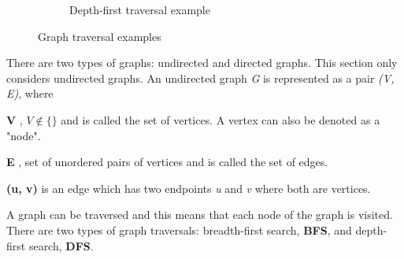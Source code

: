 \begin{figure}
	\begin{subfigure}[b]{0.3\textwidth}
		\begin{center}
		\end{center}
		\caption{Depth-first traversal example}
		\label{fig:dfs}
	\end{subfigure}
	
	\caption{Graph traversal examples}
\end{figure}
There are two types of graphs: undirected and directed graphs.
This section only considers undirected graphs.
An undirected graph \textit{G} is represented as a pair \textit{(V, E)}, where
\begin{itemizeSmall}
	\item[\textbf{V}], $V\notin \{\}$ and is called the set of vertices. A vertex can also be denoted as a "node".
	\item[\textbf{E}], set of unordered pairs of vertices and is called the set of edges.
	\item[\textbf{(u, v)}] is an edge which has two endpoints \textit{u} and \textit{v} where both are vertices.
\end{itemizeSmall}

A graph can be traversed and this means that each node of the graph is visited.
There are two types of graph traversals: breadth-first search, \textbf{BFS}, and depth-first search, \textbf{DFS}.

